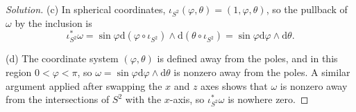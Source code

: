 \documentclass[10pt]{article}
\newcommand{\dd}{\mathrm{d}}
\newenvironment{soln}{\begin{proof}[Solution]}{\end{proof}}
\begin{document}
\begin{soln}
    (c) In spherical coordinates, $\iota_{S^2}(\varphi,\theta)
    = (1,\varphi,\theta)$, so the pullback of $\omega$ by the inclusion is
    \begin{equation*}
	\iota^*_{S^2}\omega = \sin\varphi\dd(\varphi\circ\iota_{S^2})\wedge
	\dd(\theta\circ\iota_{S^2}) = \sin\varphi\dd\varphi\wedge\dd\theta.
    \end{equation*}

    (d) The coordinate system $(\varphi,\theta)$
    is defined away from the poles, and in this region
    $0 < \varphi < \pi$, so
    $\omega = \sin\varphi\dd\varphi\wedge\dd\theta$ is nonzero
    away from the poles.
    A similar argument applied after swapping the $x$ and $z$ axes
    shows that $\omega$ is nonzero away from the
    intersections of $S^2$ with the $x$-axis, so $\iota^*_{S^2}\omega$
    is nowhere zero.
\end{soln}
\end{document}
